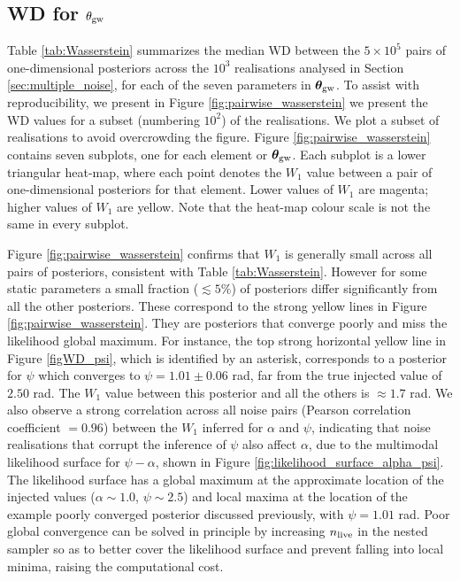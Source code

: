 \documentclass[fleqn,usenatbib,useAMS]{mnras}
\begin{document}
\subsection{WD for $\theta_{\rm gw}$} \label{sec:appendix_WD_results}
Table \ref{tab:Wasserstein} summarizes the median WD between the $5\times 10^5$ pairs of one-dimensional posteriors across the $10^3$ realisations analysed in Section \ref{sec:multiple_noise}, for each of the seven parameters in ${\boldsymbol{\theta}}_{\rm gw}$. To assist with reproducibility, we present in Figure \ref{fig:pairwise_wasserstein} we present the WD values for a subset (numbering $10^2$) of the realisations. We plot a subset of realisations to avoid overcrowding the figure. Figure \ref{fig:pairwise_wasserstein} contains seven subplots, one for each element or ${\boldsymbol{\theta}}_{\rm gw}$. Each subplot is a lower triangular heat-map, where each point denotes the $W_1$ value between a pair of one-dimensional posteriors for that element. Lower values of $W_1$ are magenta; higher values of $W_1$ are yellow. Note that the heat-map colour scale is not the same in every subplot. \newline 

 Figure \ref{fig:pairwise_wasserstein} confirms that $W_1$ is generally small across all pairs of posteriors, consistent with Table \ref{tab:Wasserstein}. However for some static parameters a small fraction ($\lesssim 5 \%$) of posteriors differ significantly from all the other posteriors. These correspond to the strong yellow lines in Figure \ref{fig:pairwise_wasserstein}. They are posteriors that converge poorly and miss the likelihood global maximum. For instance, the top strong horizontal yellow line in Figure \ref{figWD_psi}, which is identified by an asterisk, corresponds to a posterior for $\psi$ which converges to $\psi = 1.01 \pm 0.06$ rad, far from the true injected value of $2.50$ rad. The $W_1$ value between this posterior and all the others is $\approx 1.7$ rad. We also observe a strong correlation across all noise pairs (Pearson correlation coefficient $=0.96$) between the $W_1$ inferred for $\alpha$ and $\psi$, indicating that noise realisations that corrupt the inference of $\psi$ also affect $\alpha$, due to the multimodal likelihood surface for $\psi-\alpha$, shown in Figure \ref{fig:likelihood_surface_alpha_psi}. The likelihood surface has a global maximum at the approximate location of the injected values ($\alpha \sim 1.0$, $\psi\sim2.5$) and local maxima at the location of the example poorly converged posterior discussed previously, with $\psi = 1.01$ rad. Poor global convergence can be solved in principle by increasing $n_{\rm live}$ in the nested sampler so as to better cover the likelihood surface and prevent falling into local minima, raising the computational cost.
\end{document}

